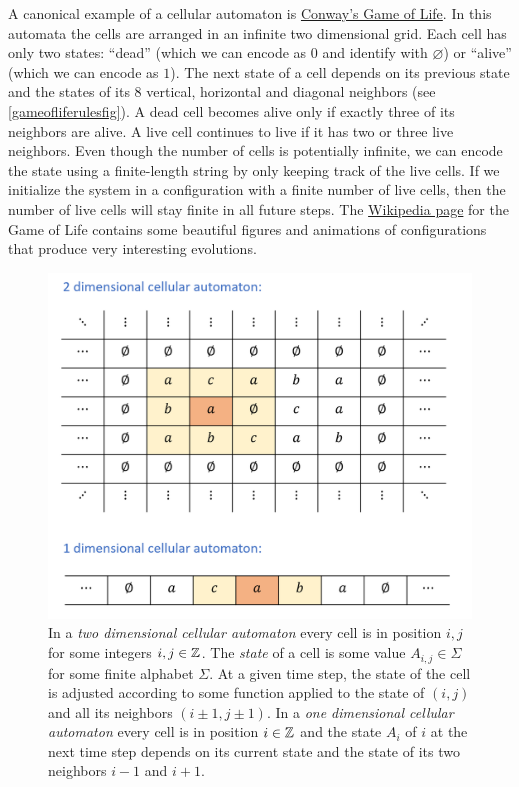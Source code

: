 A canonical example of a cellular automaton is
\href{https://en.wikipedia.org/wiki/Conway\%27s_Game_of_Life}{Conway's
Game of Life}. In this automata the cells are arranged in an infinite
two dimensional grid. Each cell has only two states: ``dead'' (which we
can encode as \(0\) and identify with \(\varnothing\)) or ``alive''
(which we can encode as \(1\)). The next state of a cell depends on its
previous state and the states of its 8 vertical, horizontal and diagonal
neighbors (see \cref{gameofliferulesfig}). A dead cell becomes alive
only if exactly three of its neighbors are alive. A live cell continues
to live if it has two or three live neighbors. Even though the number of
cells is potentially infinite, we can encode the state using a
finite-length string by only keeping track of the live cells. If we
initialize the system in a configuration with a finite number of live
cells, then the number of live cells will stay finite in all future
steps. The
\href{https://en.wikipedia.org/wiki/Conway\%27s_Game_of_Life}{Wikipedia
page} for the Game of Life contains some beautiful figures and
animations of configurations that produce very interesting evolutions.


\begin{figure}
\centering
\includegraphics[width=\textwidth, height=0.25\paperheight, keepaspectratio]{../figure/onetwodimensionalca.png}
\caption{In a \emph{two dimensional cellular automaton} every cell is in
position \(i,j\) for some integers \(i,j \in {\mathbb{Z}}\). The \emph{state} of a
cell is some value \(A_{i,j} \in \Sigma\) for some finite alphabet
\(\Sigma\). At a given time step, the state of the cell is adjusted
according to some function applied to the state of \((i,j)\) and all its
neighbors \((i \pm 1, j\pm 1)\). In a \emph{one dimensional cellular
automaton} every cell is in position \(i\in {\mathbb{Z}}\) and the state \(A_i\)
of \(i\) at the next time step depends on its current state and the
state of its two neighbors \(i-1\) and \(i+1\).}
\label{onetwodimcellularautomatafig}
\end{figure}


